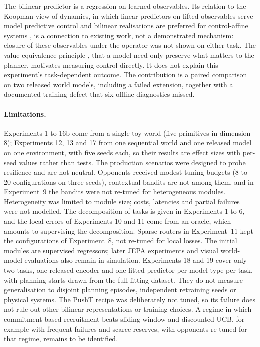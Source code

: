 \documentclass[11pt,a4paper]{article}
\begin{document}
The bilinear predictor is a regression on learned observables. Its relation to the Koopman view of dynamics, in which linear predictors on lifted observables serve model predictive control \citep{korda2018koopman} and bilinear realisations are preferred for control-affine systems \citep{bruder2020bilinear}, is a connection to existing work, not a demonstrated mechanism: closure of these observables under the operator was not shown on either task. The value-equivalence principle \citep{grimm2020value}, that a model need only preserve what matters to the planner, motivates measuring control directly. It does not explain this experiment's task-dependent outcome. The contribution is a paired comparison on two released world models, including a failed extension, together with a documented training defect that six offline diagnostics missed.

\paragraph{Limitations.} Experiments 1 to 16b come from a single toy world (five primitives in dimension 8); Experiments 12, 13 and 17 from one sequential world and one released model on one environment, with five seeds each, so their results are effect sizes with per-seed values rather than tests. The production scenarios were designed to probe resilience and are not neutral. Opponents received modest tuning budgets (8 to 20 configurations on three seeds), contextual bandits are not among them, and in Experiment~9 the bandits were not re-tuned for heterogeneous modules. Heterogeneity was limited to module size; costs, latencies and partial failures were not modelled. The decomposition of tasks is given in Experiments 1 to 6, and the local errors of Experiments 10 and 11 come from an oracle, which amounts to supervising the decomposition. Sparse routers in Experiment~11 kept the configurations of Experiment~8, not re-tuned for local losses. The initial modules are supervised regressors; later JEPA experiments and visual world-model evaluations also remain in simulation. Experiments 18 and 19 cover only two tasks, one released encoder and one fitted predictor per model type per task, with planning starts drawn from the full fitting dataset. They do not measure generalisation to disjoint planning episodes, independent retraining seeds or physical systems. The PushT recipe was deliberately not tuned, so its failure does not rule out other bilinear representations or training choices. A regime in which commitment-based recruitment beats sliding-window and discounted UCB, for example with frequent failures and scarce reserves, with opponents re-tuned for that regime, remains to be identified.
\end{document}
